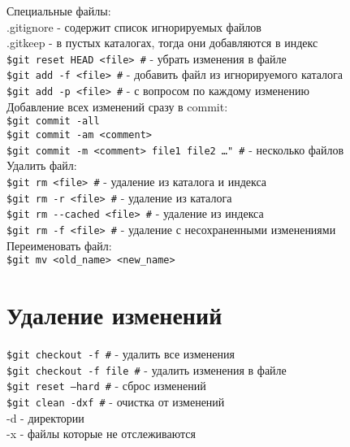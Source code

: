 \documentclass[12pt, a4paper]{article}
\begin{document}
\noindent Специальные файлы:\\
\indent.gitignore \indent - содержит список игнорируемых файлов \\
\indent.gitkeep \indent - в пустых каталогах, тогда они добавляются в индекс\\

\noindent\texttt{\$git reset HEAD <file> \indent \#} - убрать изменения в файле \\
\texttt{\$git  add -f <file> \indent \#} - добавить файл из игнорируемого каталога\\
	

\texttt{\$git add -p <file> \indent \#} - с вопросом по каждому изменению \\

\noindent Добавление всех изменений сразу в commit:\\
\indent \texttt{\$git commit -all \indent} \\
\indent \texttt{\$git commit -am <comment>} \\
\indent \texttt{\$git commit -m <comment> file1 file2 \ldots" \#} - несколько файлов \\

\noindent Удалить файл: \\
\indent \texttt{\$git rm <file> \indent \#} - удаление из каталога и индекса \\
\indent \texttt{\$git rm -r <file> \indent \#} - удаление из каталога\\
\indent \texttt{\$git rm {-}-cached <file> \indent \#} - удаление из индекса \\
\indent \texttt{\$git rm -f <file> \indent \#} - удаление с несохраненными изменениями\\

\noindent Переименовать файл:\\
\indent \texttt{\$git mv <old\_name> <new\_name>}

\section{Удаление изменений}

\texttt{\$git checkout -f \indent \#} - удалить все изменения \\
\texttt{\$git checkout -f file \indent \#} - удалить изменения в файле \\
\texttt{\$git reset --hard \indent \#}  - сброс изменений \\
\texttt{\$git clean -dxf \indent \#} - очистка от изменений \\
\indent -d - директории \\
\indent -x - файлы которые не отслеживаются \\
\end{document}
